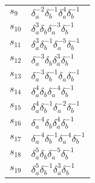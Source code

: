 \documentclass{article}
\begin{document}
\begin{center}
\begin{tabular}{ll}
$s_{9}$ & $\delta_a^{-2}\delta_b^{-1}\delta_a^{4}\delta_b^{-1}$ \\
$s_{10}$ & $\delta_a^{3}\delta_b^{}\delta_a^{-3}\delta_b^{-1}$ \\
$s_{11}$ & $\delta_a^{3}\delta_b^{-1}\delta_a^{-5}\delta_b^{-1}$ \\
$s_{12}$ & $\delta_a^{-3}\delta_b^{}\delta_a^{3}\delta_b^{-1}$ \\
$s_{13}$ & $\delta_a^{-3}\delta_b^{-1}\delta_a^{}\delta_b^{-1}$ \\
$s_{14}$ & $\delta_a^{4}\delta_b^{}\delta_a^{-4}\delta_b^{-1}$ \\
$s_{15}$ & $\delta_a^{4}\delta_b^{-1}\delta_a^{-2}\delta_b^{-1}$ \\
$s_{16}$ & $\delta_a^{-4}\delta_b^{}\delta_a^{4}\delta_b^{-1}$ \\
$s_{17}$ & $\delta_a^{-4}\delta_b^{-1}\delta_a^{-4}\delta_b^{-1}$ \\
$s_{18}$ & $\delta_a^{5}\delta_b^{}\delta_a^{-5}\delta_b^{-1}$ \\
$s_{19}$ & $\delta_a^{5}\delta_b^{-1}\delta_a^{3}\delta_b^{-1}$ \\
\bottomrule
\end{tabular}
\end{center}

\thispagestyle{empty}
\end{document}

